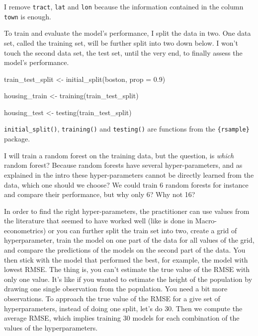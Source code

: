 \documentclass[
]{article}
\newenvironment{Shaded}{\begin{snugshade}}{\end{snugshade}}
\newcommand{\AttributeTok}[1]{\textcolor[rgb]{0.77,0.63,0.00}{#1}}
\newcommand{\FloatTok}[1]{\textcolor[rgb]{0.00,0.00,0.81}{#1}}
\newcommand{\FunctionTok}[1]{\textcolor[rgb]{0.00,0.00,0.00}{#1}}
\newcommand{\NormalTok}[1]{#1}
\newcommand{\OtherTok}[1]{\textcolor[rgb]{0.56,0.35,0.01}{#1}}
\begin{document}
I remove \texttt{tract}, \texttt{lat} and \texttt{lon} because the information contained in the column \texttt{town} is enough.

To train and evaluate the model's performance, I split the data in two.
One data set, called the training set, will be further split into two down below. I won't
touch the second data set, the test set, until the very end, to finally assess the model's
performance.

\begin{Shaded}
\begin{Highlighting}[]
\NormalTok{train\_test\_split }\OtherTok{\textless{}{-}} \FunctionTok{initial\_split}\NormalTok{(boston, }\AttributeTok{prop =} \FloatTok{0.9}\NormalTok{)}

\NormalTok{housing\_train }\OtherTok{\textless{}{-}} \FunctionTok{training}\NormalTok{(train\_test\_split)}

\NormalTok{housing\_test }\OtherTok{\textless{}{-}} \FunctionTok{testing}\NormalTok{(train\_test\_split)}
\end{Highlighting}
\end{Shaded}

\texttt{initial\_split()}, \texttt{training()} and \texttt{testing()} are functions from the \texttt{\{rsample\}} package.

I will train a random forest on the training data, but the question, is \emph{which} random forest?
Because random forests have several hyper-parameters, and as explained in the intro these
hyper-parameters cannot be directly learned from the data, which one should we choose? We could
train 6 random forests for instance and compare their performance, but why only 6? Why not 16?

In order to find the right hyper-parameters, the practitioner can
use values from the literature that seemed to have worked well (like is done in Macro-econometrics)
or you can further split the train set into two, create a grid of hyperparameter, train the model
on one part of the data for all values of the grid, and compare the predictions of the models on the
second part of the data. You then stick with the model that performed the best, for example, the
model with lowest RMSE. The thing is, you can't estimate the true value of the RMSE with only
one value. It's like if you wanted to estimate the height of the population by drawing one single
observation from the population. You need a bit more observations. To approach the true value of the
RMSE for a give set of hyperparameters, instead of doing one split, let's do 30. Then we
compute the average RMSE, which implies training 30 models for each combination of the values of the
hyperparameters.
\end{document}
